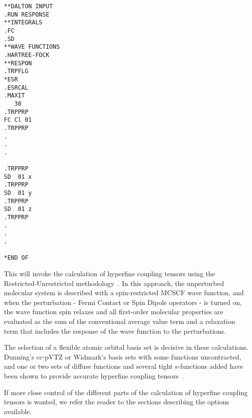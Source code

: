 \begin{verbatim}
**DALTON INPUT
.RUN RESPONSE
**INTEGRALS
.FC
.SD
**WAVE FUNCTIONS
.HARTREE-FOCK
**RESPON
.TRPFLG
*ESR
.ESRCAL
.MAXIT
   30
.TRPPRP
FC Cl 01 
.TRPPRP
.
.
.

.TRPPRP
SD  01 x 
.TRPPRP
SD  01 y 
.TRPPRP
SD  01 z 
.TRPPRP
.
.
.

*END OF
\end{verbatim}
	
	This will invoke the calculation of hyperfine
coupling tensors
using the Restricted-Unrestricted
methodology~\cite{bfpjjbjothhjajjcp97}. In this approach, the  
unperturbed molecular system is described with a spin-restricted MCSCF
wave function, and when the perturbation - Fermi Contact or Spin Dipole
operators - is turned on, the wave function spin relaxes and all
first-order molecular properties are evaluated as the sum of the
conventional average value term and a relaxation term that includes
the response of the wave function to the perturbations.

	The selection of a flexible atomic orbital basis set is decisive
in these calculations. Dunning's cc-pVTZ or Widmark's basis sets with some 
functions uncontracted, and one or two sets of diffuse functions and 
several tight s-functions added have been shown to provide accurate 
hyperfine coupling tensors~\cite{bfpjcpl232}.

	If more close control of the different parts of the calculation 
of hyperfine coupling tensors is wanted, we refer the reader to the
sections describing the options available.

